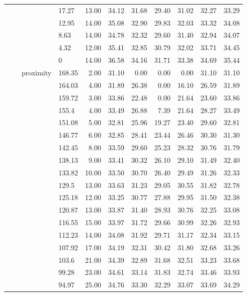 \begin{longtable}{llllrrrrrrr}
   &  &  & 17.27 & 13.00 & 34.12 & 31.68 & 29.40 & 31.02 & 32.27 & 33.29 \\ 
   &  &  & 12.95 & 14.00 & 35.08 & 32.90 & 29.83 & 32.03 & 33.32 & 34.08 \\ 
   &  &  & 8.63 & 14.00 & 34.78 & 32.32 & 29.60 & 31.40 & 32.94 & 34.07 \\ 
   &  &  & 4.32 & 12.00 & 35.41 & 32.85 & 30.79 & 32.02 & 33.71 & 34.45 \\ 
   &  &  & 0 & 14.00 & 36.58 & 34.16 & 31.71 & 33.38 & 34.69 & 35.44 \\ 
   &  & proximity & 168.35 & 2.00 & 31.10 & 0.00 & 0.00 & 0.00 & 31.10 & 31.10 \\ 
   &  &  & 164.03 & 4.00 & 31.89 & 26.38 & 0.00 & 16.10 & 26.59 & 31.89 \\ 
   &  &  & 159.72 & 3.00 & 33.86 & 22.48 & 0.00 & 21.64 & 23.60 & 33.86 \\ 
   &  &  & 155.4 & 4.00 & 33.49 & 26.88 & 7.39 & 21.64 & 28.27 & 33.49 \\ 
   &  &  & 151.08 & 5.00 & 32.81 & 25.96 & 19.27 & 23.40 & 29.60 & 32.81 \\ 
   &  &  & 146.77 & 6.00 & 32.85 & 28.41 & 23.44 & 26.46 & 30.30 & 31.30 \\ 
   &  &  & 142.45 & 8.00 & 33.59 & 29.60 & 25.23 & 28.32 & 30.76 & 31.79 \\ 
   &  &  & 138.13 & 9.00 & 33.41 & 30.32 & 26.10 & 29.10 & 31.49 & 32.40 \\ 
   &  &  & 133.82 & 10.00 & 33.50 & 30.70 & 26.40 & 29.49 & 31.26 & 32.33 \\ 
   &  &  & 129.5 & 13.00 & 33.63 & 31.23 & 29.05 & 30.55 & 31.82 & 32.78 \\ 
   &  &  & 125.18 & 12.00 & 33.25 & 30.77 & 27.88 & 29.95 & 31.50 & 32.38 \\ 
   &  &  & 120.87 & 13.00 & 33.87 & 31.40 & 28.93 & 30.76 & 32.25 & 33.08 \\ 
   &  &  & 116.55 & 15.00 & 33.97 & 31.72 & 29.66 & 30.99 & 32.26 & 32.93 \\ 
   &  &  & 112.23 & 14.00 & 34.08 & 31.92 & 29.71 & 31.17 & 32.34 & 33.15 \\ 
   &  &  & 107.92 & 17.00 & 34.19 & 32.31 & 30.42 & 31.80 & 32.68 & 33.26 \\ 
   &  &  & 103.6 & 21.00 & 34.39 & 32.89 & 31.68 & 32.51 & 33.23 & 33.68 \\ 
   &  &  & 99.28 & 23.00 & 34.61 & 33.14 & 31.83 & 32.74 & 33.46 & 33.93 \\ 
   &  &  & 94.97 & 25.00 & 34.76 & 33.30 & 32.29 & 33.07 & 33.69 & 34.29 \\ 

\end{longtable}
